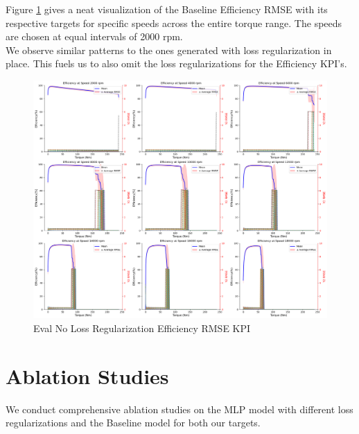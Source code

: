 \documentclass{report} %
\begin{document}
Figure \ref{fig:Eval No Loss Regularization Efficiency RMSE KPI} gives a neat visualization of the Baseline Efficiency \ac{RMSE} with its respective targets for specific speeds across the entire torque range.
The speeds are chosen at equal intervals of 2000 rpm.\\
We observe similar patterns to the ones generated with loss regularization in place.
This fuels us to also omit the loss regularizations for the Efficiency \ac{KPI}'s.\\
\begin{figure}[H]
    \centering
    \includegraphics[width=1\textwidth]{./ReportImages/rmse_eta_no_lossreg_MLP.png} 
    \caption{Eval No Loss Regularization Efficiency \ac{RMSE} \ac{KPI}} 
    \label{fig:Eval No Loss Regularization Efficiency RMSE KPI}
\end{figure}

\section{Ablation Studies}\label{sec:Ablation Studies}

We conduct comprehensive ablation studies on the \ac{MLP} model with different loss regularizations and the Baseline model for both our targets.
\end{document}
